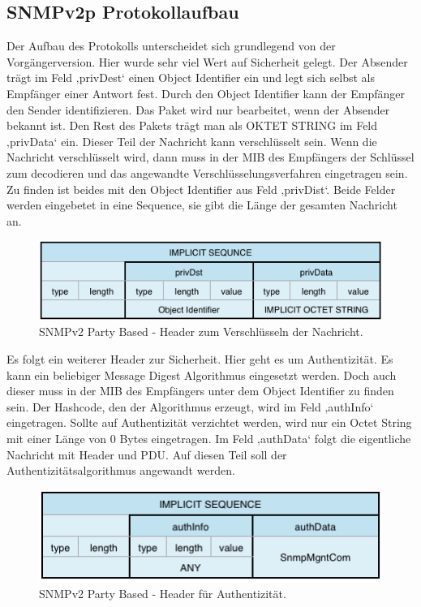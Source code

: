 \documentclass[11pt,a4paper]{article}
\begin{document}
\subsection{SNMPv2p Protokollaufbau}
Der Aufbau des Protokolls unterscheidet sich grundlegend von der Vorgängerversion. Hier wurde sehr viel Wert auf Sicherheit gelegt. Der Absender trägt im Feld ‚privDest‘ einen Object Identifier ein und legt sich selbst als Empfänger einer Antwort fest. Durch den Object Identifier kann der Empfänger den Sender identifizieren. Das Paket wird nur bearbeitet, wenn der Absender bekannt ist. Den Rest des Pakets trägt man als OKTET STRING im Feld ‚privData‘ ein. Dieser Teil der Nachricht kann verschlüsselt sein. Wenn die Nachricht verschlüsselt wird, dann muss in der MIB des Empfängers der Schlüssel zum decodieren und das angewandte Verschlüsselungsverfahren eingetragen sein. Zu finden ist beides mit den Object Identifier aus Feld ‚privDist‘. Beide Felder werden eingebetet in eine Sequence, sie gibt die Länge der gesamten Nachricht an.\\
\begin{figure}[h]
	\centering
	\includegraphics[scale=1]{Bilder/SNMPv2p-Header-Encode}
	\caption{SNMPv2 Party Based - Header zum Verschlüsseln der Nachricht.}
\end{figure}
Es folgt ein weiterer Header zur Sicherheit. Hier geht es um Authentizität. Es kann ein beliebiger Message Digest Algorithmus eingesetzt werden. Doch auch dieser muss in der MIB des Empfängers unter dem Object Identifier zu finden sein. Der Hashcode, den der Algorithmus erzeugt, wird im Feld ‚authInfo‘ eingetragen. Sollte auf Authentizität verzichtet werden, wird nur ein Octet String mit einer Länge von 0 Bytes eingetragen. Im Feld ‚authData‘ folgt die eigentliche Nachricht mit Header und PDU. Auf diesen Teil soll der Authentizitätsalgorithmus angewandt werden.\\
\begin{figure}[h]
	\centering
	\includegraphics[scale=1]{Bilder/SNMPv2p-Header-Authentizitaet}
	\caption{SNMPv2 Party Based - Header für Authentizität.}
\end{figure}
\end{document}
